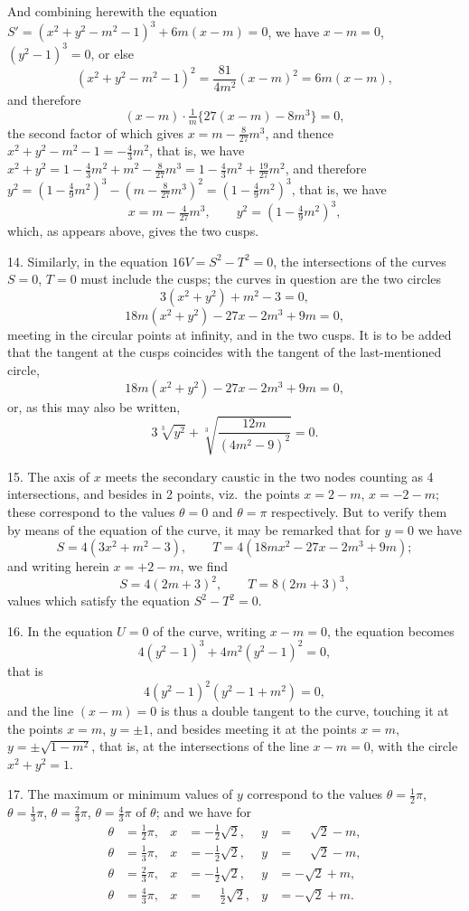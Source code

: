 \documentclass[11pt,a4paper]{article}
\theoremstyle{plain}
\begin{document}
And combining herewith the equation $S' = (x^2 + y^2 - m^2 - 1)^3 + 6m(x-m) = 0$, we have $x - m = 0$, $(y^2 - 1)^3 = 0$, or else
\[
(x^2 + y^2 - m^2 - 1)^2 = \frac{81}{4m^2}(x-m)^2 = 6m(x-m),
\]
and therefore
\[
(x-m)\cdot\tfrac{1}{m}\{27(x-m) - 8m^3\} = 0,
\]
the second factor of which gives $x = m - \frac{8}{27}m^3$, and thence $x^2 + y^2 - m^2 - 1 = -\frac{4}{3}m^2$, that is, we have $x^2 + y^2 = 1 - \frac{4}{3}m^2 + m^2 - \frac{8}{27}m^3 = 1 - \frac{4}{3}m^2 + \frac{19}{27}m^2$, and therefore $y^2 = (1 - \frac49m^2)^3 - (m - \frac{8}{27}m^3)^2 = (1 - \frac49m^2)^3$, that is, we have
\[
x = m - \tfrac{4}{27}m^3, \qquad y^2 = (1 - \tfrac49m^2)^3,
\]
which, as appears above, gives the two cusps.

14. Similarly, in the equation $16V = S^2 - T^2 = 0$, the intersections of the curves $S = 0$, $T = 0$ must include the cusps; the curves in question are the two circles
\[
3(x^2 + y^2) + m^2 - 3 = 0,
\]
\[
18m(x^2 + y^2) - 27x - 2m^3 + 9m = 0,
\]
meeting in the circular points at infinity, and in the two cusps. It is to be added that the tangent at the cusps coincides with the tangent of the last-mentioned circle,
\[
18m(x^2 + y^2) - 27x - 2m^3 + 9m = 0,
\]
or, as this may also be written,
\[
3\sqrt[3]{y^2} + \sqrt[3]{\frac{12m}{(4m^2 - 9)^2}} = 0.
\]

15. The axis of $x$ meets the secondary caustic in the two nodes counting as 4 intersections, and besides in 2 points, viz.\ the points $x = 2 - m$, $x = -2 - m$; these correspond to the values $\theta = 0$ and $\theta = \pi$ respectively. But to verify them by means of the equation of the curve, it may be remarked that for $y = 0$ we have
\[
S = 4(3x^2 + m^2 - 3), \qquad T = 4(18mx^2 - 27x - 2m^3 + 9m);
\]
and writing herein $x = +2 - m$, we find
\[
S = 4(2m + 3)^2, \qquad T = 8(2m + 3)^3,
\]
values which satisfy the equation $S^2 - T^2 = 0$.

16. In the equation $U = 0$ of the curve, writing $x - m = 0$, the equation becomes
\[
4(y^2 - 1)^3 + 4m^2(y^2 - 1)^2 = 0,
\]
that is
\[
4(y^2 - 1)^2(y^2 - 1 + m^2) = 0,
\]
and the line $(x - m) = 0$ is thus a double tangent to the curve, touching it at the points $x = m$, $y = \pm 1$, and besides meeting it at the points $x = m$, $y = \pm\sqrt{1 - m^2}$, that is, at the intersections of the line $x - m = 0$, with the circle $x^2 + y^2 = 1$.

17. The maximum or minimum values of $y$ correspond to the values $\theta = \frac12\pi$, $\theta = \frac13\pi$, $\theta = \frac23\pi$, $\theta = \frac43\pi$ of $\theta$; and we have for
\begin{align*}
\theta &= \tfrac12\pi, & x &= -\tfrac12\sqrt{2}, & y &= \phantom{-}\sqrt{2} - m, \\
\theta &= \tfrac13\pi, & x &= -\tfrac12\sqrt{2}, & y &= \phantom{-}\sqrt{2} - m, \\
\theta &= \tfrac23\pi, & x &= -\tfrac12\sqrt{2}, & y &= -\sqrt{2} + m, \\
\theta &= \tfrac43\pi, & x &= \phantom{-}\tfrac12\sqrt{2}, & y &= -\sqrt{2} + m.
\end{align*}
\end{document}
